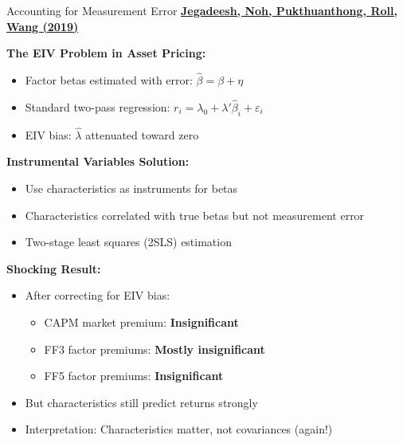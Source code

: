 \documentclass{beamer}
\begin{document}
\begin{frame}{Accounting for Measurement Error}
    \textbf{\textcolor{blue}{\href{https://doi.org/10.1016/j.jfineco.2019.02.010}{Jegadeesh, Noh, Pukthuanthong, Roll, Wang (2019)}}}
    
    
    \textbf{The EIV Problem in Asset Pricing:}
    \begin{itemize}
        \item Factor betas estimated with error: $\hat{\beta} = \beta + \eta$
        \item Standard two-pass regression: $r_i = \lambda_0 + \lambda' \hat{\beta}_i + \varepsilon_i$
        \item EIV bias: $\hat{\lambda}$ attenuated toward zero
    \end{itemize}
    
    
    \textbf{Instrumental Variables Solution:}
    \begin{itemize}
        \item Use characteristics as instruments for betas
        \item Characteristics correlated with true betas but not measurement error
        \item Two-stage least squares (2SLS) estimation
    \end{itemize}
    
    
    \textbf{Shocking Result:}
    \begin{itemize}
        \item After correcting for EIV bias:
        \begin{itemize}
            \item CAPM market premium: \textbf{Insignificant}
            \item FF3 factor premiums: \textbf{Mostly insignificant}
            \item FF5 factor premiums: \textbf{Insignificant}
        \end{itemize}
        \item But characteristics still predict returns strongly
        \item Interpretation: Characteristics matter, not covariances (again!)
    \end{itemize}
\end{frame}
\end{document}
